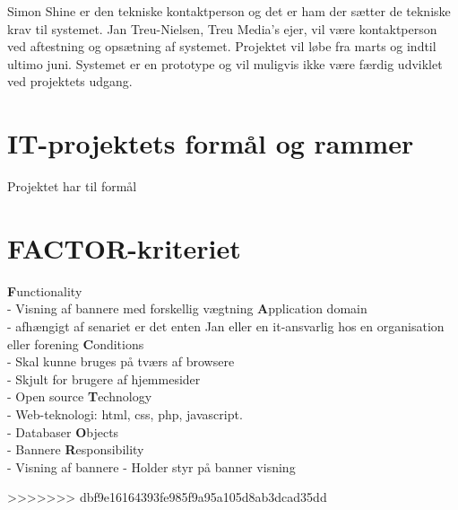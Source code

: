 \documentclass[a4paper,12pt]{article}
\begin{document}
Simon Shine er den tekniske kontaktperson og det er ham der sætter de tekniske krav til systemet. Jan Treu-Nielsen, Treu Media's ejer, vil være kontaktperson ved aftestning og opsætning af systemet. Projektet vil løbe fra marts og indtil ultimo juni. Systemet er en prototype og vil muligvis ikke være færdig udviklet ved projektets udgang. 

\section{IT-projektets formål og rammer}

Projektet har til formål 

\newpage

\section{FACTOR-kriteriet}

\large{\bf{F}}\normalsize{unctionality
\\
- Visning af bannere med forskellig vægtning}
\newline
\newline
\large{\bf{A}}\normalsize{pplication domain
\\
- afhængigt af senariet er det enten Jan eller en it-ansvarlig hos en organisation eller forening}
\newline
\newline
\large{\bf{C}}\normalsize{onditions\\
- Skal kunne bruges på tværs af browsere\\
- Skjult for brugere af hjemmesider\\
- Open source}
\newline
\newline
\large{\bf{T}}\normalsize{echnology\\
- Web-teknologi: html, css, php, javascript.\\
- Databaser}
\newline
\newline
\large{\bf{O}}\normalsize{bjects\\
- Bannere}
\newline
\newline
\large{\bf{R}}\normalsize{esponsibility\\
- Visning af bannere
- Holder styr på banner visning}

\newpage

>>>>>>> dbf9e16164393fe985f9a95a105d8ab3dcad35dd
\end{document}
